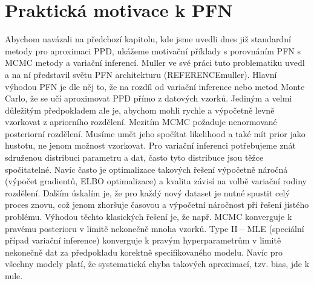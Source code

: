\section{Praktická motivace k PFN}
Abychom navázali na předchozí kapitolu, kde jsme uvedli dnes již standardní metody pro aproximaci PPD, ukážeme motivační příklady s porovnáním PFN s MCMC metody a variační inferencí.
Muller ve své práci tuto problematiku uvedl a na ní představil světu PFN architekturu (REFERENCEmuller).
Hlavní výhodou PFN je dle něj to, že na rozdíl od variační inference nebo metod Monte Carlo, že se učí aproximovat PPD přímo z datových vzorků.
Jediným a velmi důležitým předpokladem ale je, abychom mohli rychle a výpočetně levně vzorkovat z apriorního rozdělení. 
Mezitím MCMC požaduje nenormované posteriorní rozdělení.
Musíme umět jeho spočítat likelihood a také mít prior jako hustotu, ne jenom možnost vzorkovat. 
Pro variační inferenci potřebujeme znát sdruženou distribuci parametru a dat, často tyto distribuce jsou těžce spočitatelné.
Navíc často je optimalizace takových řešení výpočetně náročná (výpočet gradientů, ELBO optimalizace) a kvalita závisí na volbě variační rodiny rozdělení.
Dalším úskalím je, že pro každý nový dataset je nutné spustit celý proces znovu, což jenom zhoršuje časovou a výpočetní náročnost při řešení jistého problému.
Výhodou těchto klasických řešení je, že např. MCMC konverguje k pravému posterioru v limitě nekonečně mnoha vzorků.
Type II – MLE (speciální případ variační inference) konverguje k pravým hyperparametrům v limitě nekonečně dat za předpokladu korektně specifikovaného modelu. 
Navíc pro všechny modely platí, že systematická chyba takových aproximací, tzv. bias, jde k nule.
\par   

